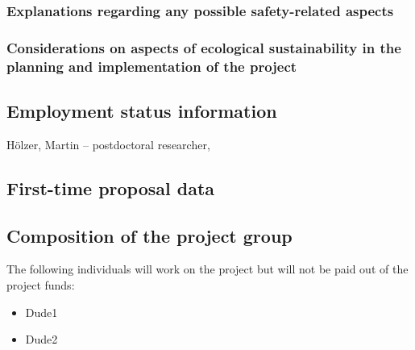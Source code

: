 \documentclass[final]{scrartcl}
\begin{document}
\subsubsection{Explanations regarding any possible safety-related aspects}



\subsubsection{Considerations on aspects of ecological sustainability in the planning and implementation of the project}

\subsection{Employment status information}
H\"olzer, Martin -- postdoctoral researcher, 

\subsection{First-time proposal data}

\subsection{Composition of the project group}
The following individuals will work on the project but will not be paid out of
the project funds:

\begin{itemize}
\item Dude1
\item Dude2
\end{itemize}
\end{document}

